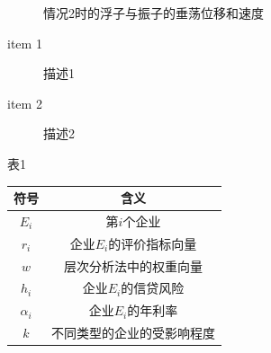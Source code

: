 \documentclass[UTF8]{ctexart}
\begin{document}
\begin{figure}[htbp]
\centering
{}
\quad
{}
\caption{情况2时的浮子与振子的垂荡位移和速度}
\end{figure}

\begin{description} %
\item[item 1] 描述1
\item[item 2] 描述2
\end{description}

\begin{table}[htbp]
\begin{center}

\setlength\tabcolsep{40pt}
表1

\renewcommand{\arraystretch}{1.4}
\begin{tabular}{c c}
\hline
符号     & 含义                  \\ \hline
$E_i$ & 第$i$个企业     \\  
$r_i$      & 企业$E_i$的评价指标向量      \\  
$w$      & 层次分析法中的权重向量        \\  
$h_i$      & 企业$E_i$的信贷风险 \\ 
$\alpha_i$      &企业$E_i$的年利率         \\ 
$k$      & 不同类型的企业的受影响程度    \\ 
 \hline
\end{tabular}

\end{center}
\end{table}
\end{document}
